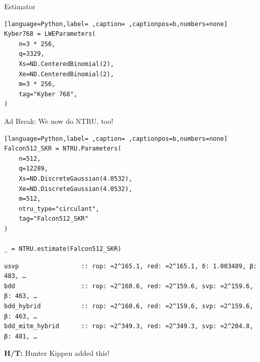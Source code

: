 \documentclass[table,10pt,aspectratio=169]{beamer}
\begin{document}
\begin{frame}[label={sec:org66b1ffd},fragile]{Estimator}
 \begin{lstlisting}[language=Python,label= ,caption= ,captionpos=b,numbers=none]
Kyber768 = LWEParameters(
    n=3 * 256,
    q=3329,
    Xs=ND.CenteredBinomial(2),
    Xe=ND.CenteredBinomial(2),
    m=3 * 256,
    tag="Kyber 768",
)
\end{lstlisting}
\end{frame}

\begin{frame}[label={sec:org93af8c9},fragile]{\alert{Ad Break: We now do NTRU, too!}}
 \begin{lstlisting}[language=Python,label= ,caption= ,captionpos=b,numbers=none]
Falcon512_SKR = NTRU.Parameters(
    n=512,
    q=12289,
    Xs=ND.DiscreteGaussian(4.0532),
    Xe=ND.DiscreteGaussian(4.0532),
    m=512,
    ntru_type="circulant",
    tag="Falcon512_SKR"
)

_ = NTRU.estimate(Falcon512_SKR)
\end{lstlisting}

\begin{verbatim}
usvp                 :: rop: ≈2^165.1, red: ≈2^165.1, δ: 1.003489, β: 483, …
bdd                  :: rop: ≈2^160.6, red: ≈2^159.6, svp: ≈2^159.6, β: 463, …
bdd_hybrid           :: rop: ≈2^160.6, red: ≈2^159.6, svp: ≈2^159.6, β: 463, …
bdd_mitm_hybrid      :: rop: ≈2^349.3, red: ≈2^349.3, svp: ≈2^204.8, β: 481, …
\end{verbatim}


\textbf{H/T:} Hunter Kippen added this!
\end{frame}
\end{document}
